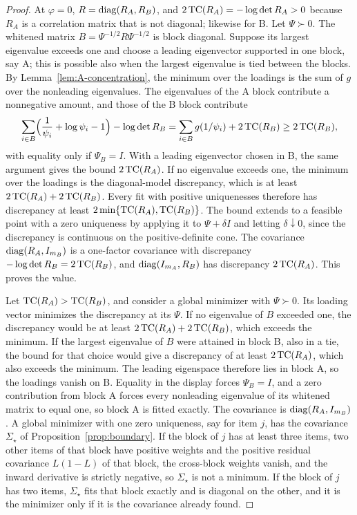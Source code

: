 \begin{proof}
At $\varphi=0$, $R=\operatorname{diag}(R_A,R_B)$, and $2\operatorname{TC}(R_A)=-\log\det R_A>0$ because $R_A$ is a correlation matrix that is not diagonal; likewise for B. Let $\Psi\succ0$. The whitened matrix $B=\Psi^{-1/2}R\Psi^{-1/2}$ is block diagonal. Suppose its largest eigenvalue exceeds one and choose a leading eigenvector supported in one block, say A; this is possible also when the largest eigenvalue is tied between the blocks. By Lemma~\ref{lem:A-concentration}, the minimum over the loadings is the sum of $g$ over the nonleading eigenvalues. The eigenvalues of the A block contribute a nonnegative amount, and those of the B block contribute
\[
\sum_{i\in B}\Bigl(\frac1{\psi_i}+\log\psi_i-1\Bigr)-\log\det R_B
=\sum_{i\in B}g(1/\psi_i)+2\operatorname{TC}(R_B)\ge2\operatorname{TC}(R_B),
\]
with equality only if $\Psi_B=I$. With a leading eigenvector chosen in B, the same argument gives the bound $2\operatorname{TC}(R_A)$. If no eigenvalue exceeds one, the minimum over the loadings is the diagonal-model discrepancy, which is at least $2\operatorname{TC}(R_A)+2\operatorname{TC}(R_B)$. Every fit with positive uniquenesses therefore has discrepancy at least $2\min\{\operatorname{TC}(R_A),\operatorname{TC}(R_B)\}$. The bound extends to a feasible point with a zero uniqueness by applying it to $\Psi+\delta I$ and letting $\delta\downarrow0$, since the discrepancy is continuous on the positive-definite cone. The covariance $\operatorname{diag}(R_A,I_{m_B})$ is a one-factor covariance with discrepancy $-\log\det R_B=2\operatorname{TC}(R_B)$, and $\operatorname{diag}(I_{m_A},R_B)$ has discrepancy $2\operatorname{TC}(R_A)$. This proves the value.

Let $\operatorname{TC}(R_A)>\operatorname{TC}(R_B)$, and consider a global minimizer with $\Psi\succ0$. Its loading vector minimizes the discrepancy at its $\Psi$. If no eigenvalue of $B$ exceeded one, the discrepancy would be at least $2\operatorname{TC}(R_A)+2\operatorname{TC}(R_B)$, which exceeds the minimum. If the largest eigenvalue of $B$ were attained in block B, also in a tie, the bound for that choice would give a discrepancy of at least $2\operatorname{TC}(R_A)$, which also exceeds the minimum. The leading eigenspace therefore lies in block A, so the loadings vanish on B. Equality in the display forces $\Psi_B=I$, and a zero contribution from block A forces every nonleading eigenvalue of its whitened matrix to equal one, so block A is fitted exactly. The covariance is $\operatorname{diag}(R_A,I_{m_B})$. A global minimizer with one zero uniqueness, say for item $j$, has the covariance $\Sigma_\star$ of Proposition~\ref{prop:boundary}. If the block of $j$ has at least three items, two other items of that block have positive weights and the positive residual covariance $L(1-L)$ of that block, the cross-block weights vanish, and the inward derivative is strictly negative, so $\Sigma_\star$ is not a minimum. If the block of $j$ has two items, $\Sigma_\star$ fits that block exactly and is diagonal on the other, and it is the minimizer only if it is the covariance already found.


\end{proof}
